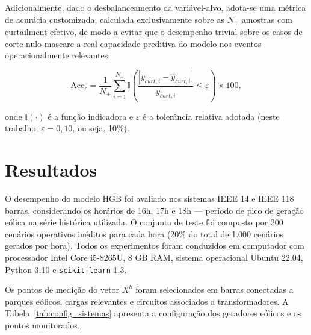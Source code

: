 \documentclass[conference]{IEEEtran}
\begin{document}
Adicionalmente, dado o desbalanceamento da variável-alvo, adota-se uma
métrica de acurácia customizada, calculada exclusivamente sobre as
$N_{+}$ amostras com curtailment efetivo, de modo a evitar que o
desempenho trivial sobre os casos de corte nulo mascare a real
capacidade preditiva do modelo nos eventos operacionalmente relevantes:

\begin{equation}
\mathrm{Acc}_{\varepsilon} =
    \frac{1}{N_{+}}\sum_{i=1}^{N_{+}}
    \mathbb{I}\!\left(
        \frac{|y_{curt,i} - \hat{y}_{curt,i}|}{y_{curt,i}} \leq \varepsilon
    \right) \times 100,
\label{eq:acc}
\end{equation}

\noindent onde $\mathbb{I}(\cdot)$ é a função indicadora e $\varepsilon$ é
a tolerância relativa adotada (neste trabalho, $\varepsilon = 0{,}10$,
ou seja, 10\%).

\section{Resultados}
\label{sec:resultados}

O desempenho do modelo HGB foi avaliado nos sistemas IEEE 14 e IEEE 118 barras,
considerando os horários de 16h, 17h e 18h — período de pico de geração
eólica na série histórica utilizada. O conjunto de teste foi composto por
200 cenários operativos inéditos para cada hora (20\% do total de 1.000
cenários gerados por hora). Todos os experimentos foram conduzidos em
computador com processador Intel Core i5-8265U,
8 GB RAM, sistema operacional Ubuntu 22.04, Python 3.10 e
\texttt{scikit-learn} 1.3.

Os pontos de medição do vetor $X^h$ foram selecionados em barras conectadas
a parques eólicos, cargas relevantes e circuitos associados a transformadores.
A Tabela~\ref{tab:config_sistemas} apresenta a configuração dos geradores
eólicos e os pontos monitorados.

\begin{table}[h!]
\centering
\caption{Configuração dos geradores eólicos e pontos de medição.}
\label{tab:config_sistemas}
\setlength{\tabcolsep}{3pt}
\end{table}
\end{document}
